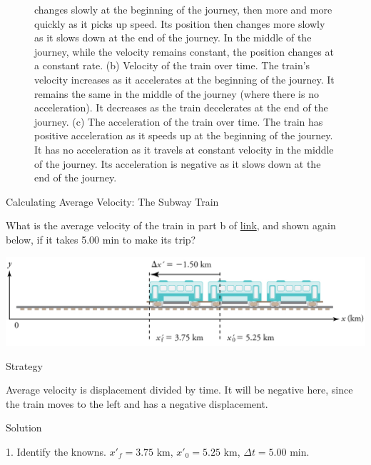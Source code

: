 \documentclass[
]{book}
\newenvironment{tinysection}{}{}
\begin{document}
\begin{figure}
{{changes slowly at the beginning of the journey, then more and more
quickly as it picks up speed. Its position then changes more slowly as
it slows down at the end of the journey. In the middle of the journey,
while the velocity remains constant, the position changes at a constant
rate. (b) Velocity of the train over time. The train's velocity
increases as it accelerates at the beginning of the journey. It remains
the same in the middle of the journey (where there is no acceleration).
It decreases as the train decelerates at the end of the journey. (c) The
acceleration of the train over time. The train has positive acceleration
as it speeds up at the beginning of the journey. It has no acceleration
as it travels at constant velocity in the middle of the journey. Its
acceleration is negative as it slows down at the end of the
journey.}\label{import-auto-id2596938}
}
\end{figure}

\hypertarget{fs-id1348757}{}
Calculating Average Velocity: The Subway Train

What is the average velocity of the train in part b of
\protect\hyperlink{fs-id1744930}{link}, and shown again below, if
it takes 5.00 min to make its trip?

\includegraphics{images/Figure_02_03_04a.jpg}

\begin{tinysection}

{Strategy}

\end{tinysection}

Average velocity is displacement divided by time. It will be negative
here, since the train moves to the left and has a negative displacement.

\begin{tinysection}

{Solution}

\end{tinysection}

1. Identify the knowns. \({{x\prime}_{f} = 3}\text{.75\ km}\),
\({{x\prime}_{0} =}\text{5.25\ km}\), \({{\Delta t =}\text{5.00\ min}}{}\).
\end{document}
